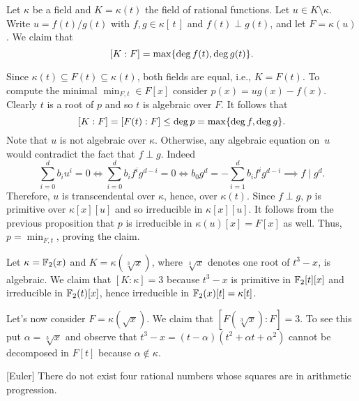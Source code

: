 \begin{xmpl}\label{xmpl:k(t)/k(u)}
    Let $\kappa$ be a field and $K=\kappa(t)$ the field of rational functions. Let $u \in K\setminus\kappa$. Write $u=f(t) / g(t)$ with $f, g \in \kappa[\,t\,]$ and $f(t)\perp g(t)$, and let $F=\kappa(u)$. We claim that
    $$
    [K: F]=\max\{\deg f(t), \deg g(t)\}.
    $$

    Since $\kappa(t)\subseteq F(t)\subseteq\kappa(t)$, both fields are equal, i.e., $K=F(t)$. To compute the minimal $\min_{F,t}\in F[x]$ consider $p(x)=ug(x)-f(x)$. Clearly $t$ is a root of $p$ and so $t$ is algebraic over $F$. It follows that
    $$
        [K:F]=[F(t):F]\le\deg p=\max\{\deg f,\deg g\}.
    $$
    Note that $u$ is not algebraic over $\kappa$. Otherwise, any algebraic equation on~$u$ would contradict the fact that $f\perp g$. Indeed
    $$
        \sum_{i=0}^db_iu^i=0
            \iff \sum_{i=0}^db_if^ig^{d-i}=0
            \iff b_0g^d = -\sum_{i=1}^db_if^ig^{d-i}
            \implies f\mid g^d.
    $$
    Therefore, $u$ is transcendental over $\kappa$, hence, over $\kappa(t)$. Since $f\perp g$, $p$ is primitive over $\kappa[x][u]$ and so irreducible in $\kappa[x][u]$. It follows from the previous proposition that $p$ is irreducible in $\kappa(u)[x]=F[x]$ as well. Thus, $p=\min_{F,t}$, proving the claim.
\end{xmpl}


\begin{xmpl}\label{xmpl:sqrt3 x-has-degree-3}
    Let $\kappa=\mathbb F_2(x)$ and $K=\kappa(\sqrt[3]x)$, where $\sqrt[3]x$ denotes one root of $t^3-x$, is algebraic. We claim that $[K:\kappa]=3$ because $t^3-x$ is primitive in $\mathbb F_2[t][x]$ and irreducible in $\mathbb F_2(t)[x]$, hence irreducible in $\mathbb F_2(x)[t]=\kappa[t]$.

    Let's now consider $F=\kappa(\sqrt x)$. We claim that $[F(\sqrt[3]x):F]=3$. To see this put $\alpha=\sqrt[3]x$ and observe that $t^3-x=(t-\alpha)(t^2+\alpha t+\alpha^2)$ cannot be decomposed in $F[t]$ because $\alpha\notin\kappa$.
\end{xmpl}


\begin{lem}\label{lem:euler} {\rm[Euler]}
    There do not exist four rational numbers whose squares are in arithmetic progression.
\end{lem}

